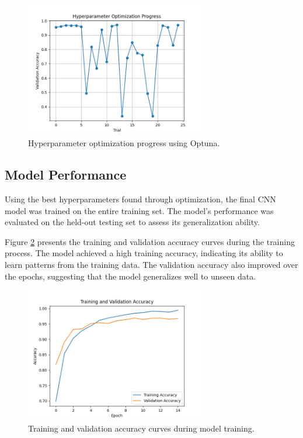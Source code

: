 \documentclass{article}
\begin{document}
\begin{figure}
    \centering
    \includegraphics[width=0.7\textwidth]{hyperparameter_optimization.png}
    \caption{Hyperparameter optimization progress using Optuna.}
    \label{fig:optimization}
\end{figure}

\subsection{Model Performance}
Using the best hyperparameters found through optimization, the final CNN model was trained on the entire training set. The model's performance was evaluated on the held-out testing set to assess its generalization ability.

Figure \ref{fig:accuracy} presents the training and validation accuracy curves during the training process. The model achieved a high training accuracy, indicating its ability to learn patterns from the training data. The validation accuracy also improved over the epochs, suggesting that the model generalizes well to unseen data.

\begin{figure}
    \centering
    \includegraphics[width=0.7\textwidth]{accuracy_curves.png}
    \caption{Training and validation accuracy curves during model training.}
    \label{fig:accuracy}
\end{figure}
\end{document}
